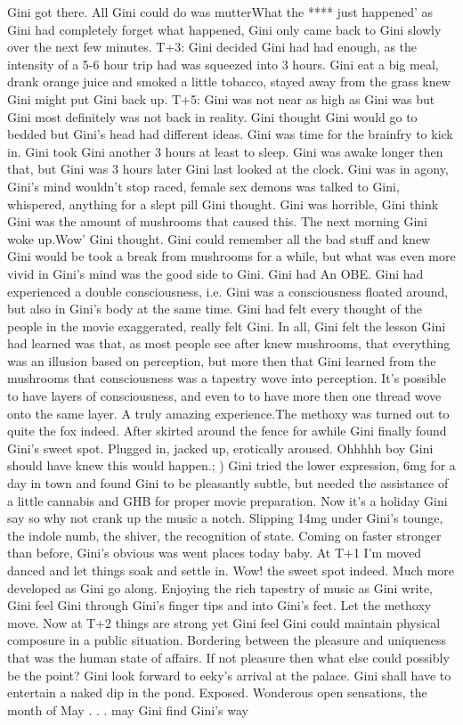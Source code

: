\documentclass[12pt]{book}
\begin{document}
Gini got there. All Gini could do was mutterWhat the **** just happened' as Gini had completely forget what happened, Gini only came back to Gini slowly over the next few minutes. T+3: Gini decided Gini had had enough, as the intensity of a 5-6 hour trip had was squeezed into 3 hours. Gini eat a big meal, drank orange juice and smoked a little tobacco, stayed away from the grass knew Gini might put Gini back up. T+5: Gini was not near as high as Gini was but Gini most definitely was not back in reality. Gini thought Gini would go to bedded but Gini's head had different ideas. Gini was time for the brainfry to kick in. Gini took Gini another 3 hours at least to sleep. Gini was awake longer then that, but Gini was 3 hours later Gini last looked at the clock. Gini was in agony, Gini's mind wouldn't stop raced, female sex demons was talked to Gini, whispered, anything for a slept pill Gini thought. Gini was horrible, Gini think Gini was the amount of mushrooms that caused this. The next morning Gini woke up.Wow' Gini thought. Gini could remember all the bad stuff and knew Gini would be took a break from mushrooms for a while, but what was even more vivid in Gini's mind was the good side to Gini. Gini had An OBE. Gini had experienced a double consciousness, i.e. Gini was a consciousness floated around, but also in Gini's body at the same time. Gini had felt every thought of the people in the movie exaggerated, really felt Gini. In all, Gini felt the lesson Gini had learned was that, as most people see after knew mushrooms, that everything was an illusion based on perception, but more then that Gini learned from the mushrooms that consciousness was a tapestry wove into perception. It's possible to have layers of consciousness, and even to to have more then one thread wove onto the same layer. A truly amazing experience.The methoxy was turned out to quite the fox indeed. After skirted around the fence for awhile Gini finally found Gini's sweet spot. Plugged in, jacked up, erotically aroused. Ohhhhh boy Gini should have knew this would happen.; ) Gini tried the lower expression, 6mg for a day in town and found Gini to be pleasantly subtle, but needed the assistance of a little cannabis and GHB for proper movie preparation. Now it's a holiday Gini say so why not crank up the music a notch. Slipping 14mg under Gini's tounge, the indole numb, the shiver, the recognition of state. Coming on faster stronger than before, Gini's obvious was went places today baby. At T+1 I'm moved danced and let things soak and settle in. Wow! the sweet spot indeed. Much more developed as Gini go along. Enjoying the rich tapestry of music as Gini write, Gini feel Gini through Gini's finger tips and into Gini's feet. Let the methoxy move. Now at T+2 things are strong yet Gini feel Gini could maintain physical composure in a public situation. Bordering between the pleasure and uniqueness that was the human state of affairs. If not pleasure then what else could possibly be the point? Gini look forward to eeky's arrival at the palace. Gini shall have to entertain a naked dip in the pond. Exposed. Wonderous open sensations, the month of May . . .  may Gini find Gini's way
\end{document}
